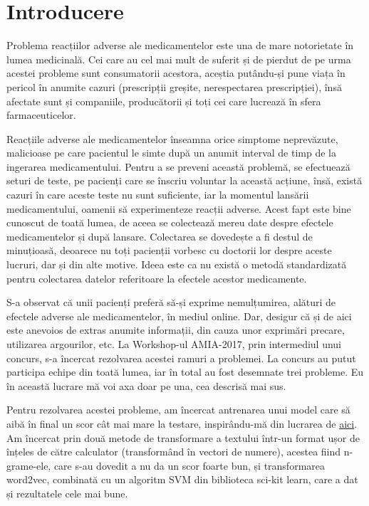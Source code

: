 \chapter*{Introducere} 

Problema reacțiilor adverse ale medicamentelor este una de mare notorietate 
în lumea medicinală. Cei care au cel mai mult de suferit și de pierdut de pe
urma acestei probleme sunt consumatorii acestora, aceștia putându-și pune viața
în pericol în anumite cazuri (prescripții greșite, nerespectarea prescripției),
însă afectate sunt și companiile, producătorii și toți cei care lucrează în sfera
farmaceuticelor. 

Reacțiile adverse ale medicamentelor înseamna orice simptome neprevăzute, malicioase
pe care pacientul le simte după un anumit interval de timp de la ingerarea medicamentului.
Pentru a se preveni această problemă, se efectuează seturi de teste, pe pacienți care se
înscriu voluntar la această acțiune, însă, există cazuri în care aceste teste nu sunt
suficiente, iar la momentul lansării medicamentului, oamenii să experimenteze reacții
adverse. Acest fapt este bine cunoscut de toată lumea, de aceea se colectează mereu
date despre efectele medicamentelor și după lansare. Colectarea se dovedește a fi
destul de minuțioasă, deoarece nu toți pacienții vorbesc cu doctorii lor despre aceste
lucruri, dar și din alte motive. Ideea este ca nu există o metodă standardizată pentru
colectarea datelor referitoare la efectele acestor medicamente.

S-a observat că unii pacienți preferă să-și exprime nemulțumirea, alături de efectele
adverse ale medicamentelor, în mediul online. Dar, desigur că și de aici este anevoios
de extras anumite informații, din cauza unor exprimări precare, utilizarea argourilor, etc.
La Workshop-ul AMIA-2017, prin intermediul unui concurs, s-a încercat rezolvarea acestei
ramuri a problemei. La concurs au putut participa echipe din toată lumea, iar în total au
fost desemnate trei probleme. Eu în această lucrare mă voi axa doar pe una, cea descrisă mai sus.

Pentru rezolvarea acestei probleme, am încercat antrenarea unui model care să aibă în final 
un scor cât mai mare la testare, inspirându-mă din lucrarea de \href{https://arxiv.org/pdf/1805.04558.pdf}{aici}. 
Am încercat prin două metode de transformare a textului 
într-un format ușor de înțeles de către calculator (transformând în vectori de numere),
acestea fiind n-grame-ele, care s-au dovedit a nu da un scor foarte bun, și transformarea
word2vec, combinată cu un algoritm SVM din biblioteca sci-kit learn, care a dat și rezultatele
cele mai bune.

